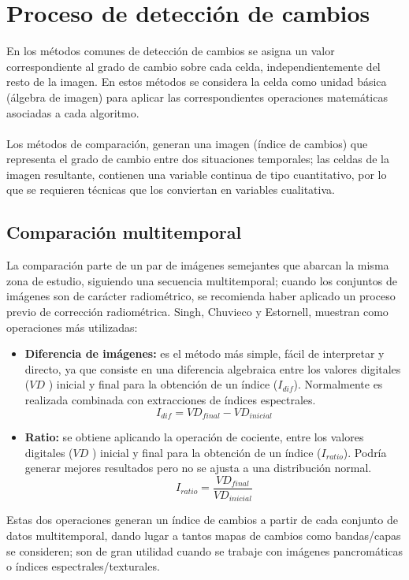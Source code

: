 \section{Proceso de detecci\'on de cambios}
En los m\'etodos comunes de detecci\'on de cambios se asigna un valor correspondiente al grado de cambio sobre cada celda, independientemente del resto de la imagen. En estos m\'etodos se considera la celda como unidad b\'asica (\'algebra de imagen) para aplicar las correspondientes operaciones matem\'aticas asociadas a cada algoritmo.\\~\\
Los m\'etodos de comparaci\'on, generan una imagen (\'indice de cambios) que representa el grado de cambio entre dos situaciones temporales; las celdas de la imagen resultante, contienen una variable continua de tipo cuantitativo, por lo que se requieren t\'ecnicas que los conviertan en variables cualitativa\cite{martinez2013normalizacion}.
\subsection{Comparaci\'on multitemporal}
La comparaci\'on parte de un par de im\'agenes semejantes que abarcan la misma zona de estudio, siguiendo una secuencia multitemporal; cuando los conjuntos de im\'agenes son de car\'acter radiom\'etrico, se recomienda haber aplicado un proceso previo de correcci\'on radiom\'etrica. Singh\cite{singh1989review}, Chuvieco\cite{chuvieco1998factor} y Estornell\cite{estornell2004analisis}, muestran como operaciones más utilizadas:
	\begin{itemize}
		\item \textbf{Diferencia de im\'agenes:} es el m\'etodo m\'as simple, f\'acil de interpretar y directo, ya que consiste en una diferencia algebraica entre los valores digitales ($ VD $ ) inicial y final para la obtenci\'on de un \'indice ($ I_{dif} $). Normalmente es realizada combinada  con extracciones de \'indices espectrales.
								\begin{equation}
								I_{dif} = VD_{final}-VD_{inicial}
								\end{equation} 	
				\item \textbf{Ratio:} se obtiene aplicando la operación de cociente, entre los valores digitales ($ VD $ ) inicial y final para la obtenci\'on de un \'indice ($ I_{ratio} $). Podr\'ia  generar mejores resultados pero no se ajusta a una distribución normal.
										\begin{equation}
										I_{ratio} = \dfrac{VD_{final}}{VD_{inicial}}
										\end{equation} 	

		\end{itemize}
Estas dos operaciones generan un \'indice de cambios a partir de cada conjunto de datos multitemporal, dando lugar a tantos mapas de cambios como bandas/capas se consideren; son de gran utilidad cuando se trabaje con im\'agenes pancrom\'aticas o \'indices espectrales/texturales.
